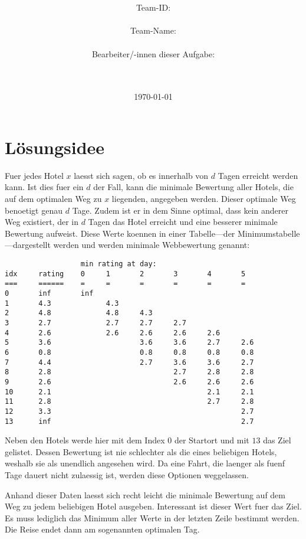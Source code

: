 \documentclass[a4paper,10pt,ngerman]{scrartcl}
\title{\textbf{\Huge\Aufgabe}}
\author{\LARGE Team-ID: \LARGE \TeamId \\\\
	    \LARGE Team-Name: \LARGE \TeamName \\\\
	    \LARGE Bearbeiter/-innen dieser Aufgabe: \\ 
	    \LARGE \Namen\\\\}
\date{\LARGE\today}
\begin{document}
\maketitle
\tableofcontents

\vspace{0.5cm}

\section{Lösungsidee}
Fuer jedes Hotel $x$ laesst sich sagen, ob es innerhalb von $d$ Tagen erreicht werden kann.
Ist dies fuer ein $d$ der Fall, kann die minimale Bewertung aller Hotels, die auf dem optimalen Weg zu $x$ liegenden, angegeben werden.
Dieser optimale Weg benoetigt genau $d$ Tage.
Zudem ist er in dem Sinne optimal, dass kein anderer Weg existiert, der in $d$ Tagen das Hotel erreicht und eine besserer minimale Bewertung aufweist.
Diese Werte koennen in einer Tabelle---der Minimumstabelle---dargestellt werden und werden minimale Webbewertung genannt:
\begin{lstlisting}
                  min rating at day:
idx     rating    0     1       2       3       4       5
===     ======    =     =       =       =       =       =
0       inf       inf
1       4.3             4.3
2       4.8             4.8     4.3
3       2.7             2.7     2.7     2.7
4       2.6             2.6     2.6     2.6     2.6
5       3.6                     3.6     3.6     2.7     2.6
6       0.8                     0.8     0.8     0.8     0.8
7       4.4                     2.7     3.6     3.6     2.7
8       2.8                             2.7     2.8     2.8
9       2.6                             2.6     2.6     2.6
10      2.1                                     2.1     2.1
11      2.8                                     2.7     2.8
12      3.3                                             2.7
13      inf                                             2.7
\end{lstlisting}
Neben den Hotels werde hier mit dem Index $0$ der Startort und mit $13$ das Ziel gelistet.
Dessen Bewertung ist nie schlechter als die eines beliebigen Hotels, weshalb sie als unendlich angesehen wird.
Da eine Fahrt, die laenger als fuenf Tage dauert nicht zulaessig ist, werden diese Optionen weggelassen.

Anhand dieser Daten laesst sich recht leicht die minimale Bewertung auf dem Weg zu jedem beliebigen Hotel ausgeben.
Interessant ist dieser Wert fuer das Ziel.
Es muss lediglich das Minimum aller Werte in der letzten Zeile bestimmt werden.
Die Reise endet dann am sogenannten optimalen Tag.
\end{document}
